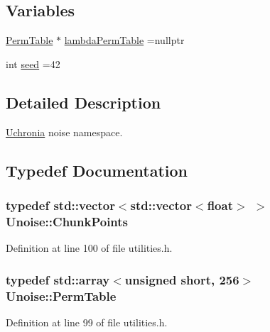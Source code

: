\subsection*{Variables}
\begin{DoxyCompactItemize}
\item 
\hyperlink{namespace_unoise_ae11142038f2dd1bea2711b2b99bbfaf6}{Perm\-Table} $\ast$ \hyperlink{namespace_unoise_acf4515c07424188371eeb9cf77d34fb3}{lambda\-Perm\-Table} =nullptr
\item 
int \hyperlink{namespace_unoise_ae6356ffd0fec247f6d19c762e1757fc3}{seed} =42
\end{DoxyCompactItemize}


\subsection{Detailed Description}
\hyperlink{namespace_uchronia}{Uchronia} noise namespace. 

\subsection{Typedef Documentation}
\hypertarget{namespace_unoise_ac1e5c6227ab68e4e8c1ad57fdbddf51b}{
\subsubsection[{Chunk\-Points}]{\setlength{\rightskip}{0pt plus 5cm}typedef std\-::vector$<$std\-::vector$<$float$>$ $>$ {\bf Unoise\-::\-Chunk\-Points}}}\label{namespace_unoise_ac1e5c6227ab68e4e8c1ad57fdbddf51b}


Definition at line 100 of file utilities.\-h.

\hypertarget{namespace_unoise_ae11142038f2dd1bea2711b2b99bbfaf6}{
\subsubsection[{Perm\-Table}]{\setlength{\rightskip}{0pt plus 5cm}typedef std\-::array$<$unsigned short, 256$>$ {\bf Unoise\-::\-Perm\-Table}}}\label{namespace_unoise_ae11142038f2dd1bea2711b2b99bbfaf6}


Definition at line 99 of file utilities.\-h.



